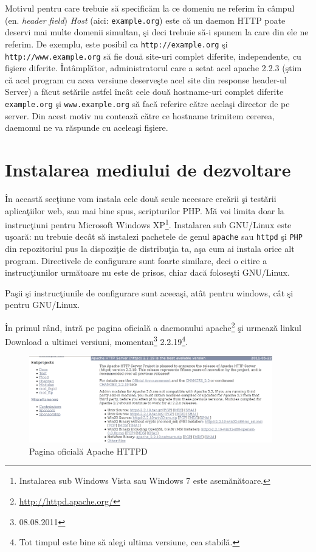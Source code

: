 Motivul pentru care trebuie să specificăm la ce domeniu ne referim în câmpul
(en. \textsl{header field}) \textsl{Host} (aici: \texttt{example.org}) este că un daemon HTTP
poate deservi mai multe domenii simultan, şi deci trebuie să-i spunem la care
din ele ne referim.
De exemplu, este posibil ca \texttt{http://example.org} şi
\texttt{http://www.example.org} să fie două site-uri complet diferite, independente, cu
fişiere diferite. Întâmplător, administratorul care a setat acel apache 2.2.3 (ştim că
acel program cu acea versiune deserveşte acel site din response header-ul {\glqq}Server{\grqq}) a făcut setările astfel
încât cele două hostname-uri complet diferite \texttt{example.org} şi \texttt{www.example.org}
să facă referire către acelaşi director de pe server. Din acest motiv nu contează
către ce hostname trimitem cererea, daemonul ne va răspunde cu aceleaşi fişiere.

\section{Instalarea mediului de dezvoltare}
În această secţiune vom instala cele două scule necesare creării şi testării
aplicaţiilor web, sau mai bine spus, scripturilor PHP. Mă voi limita doar
la instrucţiuni pentru Microsoft Windows XP\footnote{Instalarea sub Windows Vista sau 
Windows 7 este asemănătoare.}. Instalarea sub GNU/Linux este uşoară: nu trebuie
decât să instalezi pachetele de genul \texttt{apache} sau \texttt{httpd}
şi \texttt{PHP} din repozitoriul
pus la dispoziţie de distribuţia ta, aşa cum ai instala orice alt program.
Directivele de configurare sunt foarte similare, deci o citire a instrucţiunilor
următoare nu este de prisos, chiar dacă foloseşti GNU/Linux.

Paşii şi instrucţiunile de configurare sunt aceeaşi,
atât pentru windows, cât şi pentru GNU/Linux.

În primul rând, intră pe pagina oficială a daemonului
apache\footnote{\url{http://httpd.apache.org/}} şi urmează linkul
Download a ultimei versiuni, momentan\footnote{08.08.2011} 2.2.19\footnote{Tot
timpul este bine să alegi ultima versiune, cea stabilă.}.


\begin{figure}[ht!]
  \centering
    \includegraphics[width=400px]{cap01/Screenshot.png}
  \caption{Pagina oficială Apache HTTPD}
  \label{fig:httpd homepage}
\end{figure}


